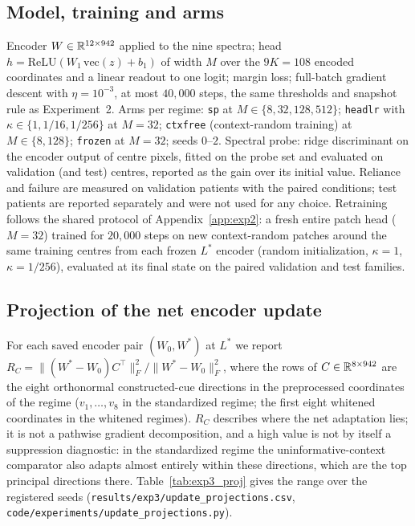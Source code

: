 \subsection{Model, training and arms}
Encoder $W\in\mathbb{R}^{12\times942}$ applied to the nine spectra; head
$h=\mathrm{ReLU}(W_1\,\mathrm{vec}(z)+b_1)$ of width $M$ over the $9K=108$
encoded coordinates and a linear readout to one logit; margin loss;
full-batch gradient descent with $\eta=10^{-3}$, at most $40{,}000$ steps,
the same thresholds and snapshot rule as Experiment~2. Arms per regime:
\texttt{sp} at $M\in\{8,32,128,512\}$; \texttt{headlr} with
$\kappa\in\{1,1/16,1/256\}$ at $M=32$; \texttt{ctxfree} (context-random
training) at $M\in\{8,128\}$; \texttt{frozen} at $M=32$; seeds $0$--$2$.
Spectral probe: ridge discriminant on the encoder output of centre pixels,
fitted on the probe set and evaluated on validation (and test) centres,
reported as the gain over its initial value. Reliance and failure are
measured on validation patients with the paired conditions; test patients
are reported separately and were not used for any choice. Retraining
follows the shared protocol of Appendix~\ref{app:exp2}: a fresh entire
patch head ($M=32$) trained for $20{,}000$ steps on new context-random
patches around the same training centres from each frozen $L^\ast$ encoder
(random initialization, $\kappa=1$, $\kappa=1/256$), evaluated at its final
state on the paired validation and test families.

\subsection{Projection of the net encoder update}
For each saved encoder pair $(W_0,W^\ast)$ at $L^\ast$ we report
$R_C=\|(W^\ast-W_0)C^\top\|_F^2/\|W^\ast-W_0\|_F^2$, where the rows of
$C\in\mathbb{R}^{8\times942}$ are the eight orthonormal constructed-cue directions
in the preprocessed coordinates of the regime ($v_1,\dots,v_8$ in the
standardized regime; the first eight whitened coordinates in the whitened
regimes). $R_C$ describes where the net adaptation lies; it is not a
pathwise gradient decomposition, and a high value is not by itself a
suppression diagnostic: in the standardized regime the uninformative-context
comparator also adapts almost entirely within these directions, which are
the top principal directions there. Table~\ref{tab:exp3_proj} gives the
range over the registered seeds
(\texttt{results/exp3/update\_projections.csv},
\texttt{code/experiments/update\_projections.py}).


